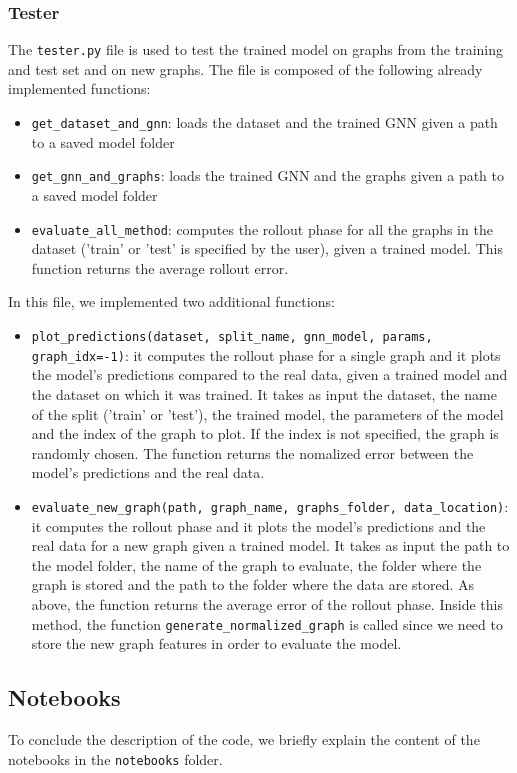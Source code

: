 \documentclass[11pt,a4paper]{article}
\begin{document}
\subsubsection*{Tester}
The \texttt{tester.py} file is used to test the trained model on graphs from the training and test set and on new graphs. The file is composed of the following already implemented functions: 
\begin{itemize}
    \item \texttt{get\_dataset\_and\_gnn}: loads the dataset and the trained GNN given a path to a saved model folder
    \item \texttt{get\_gnn\_and\_graphs}: loads the trained GNN and the graphs given a path to a saved model folder
    \item \texttt{evaluate\_all\_method}: computes the rollout phase for all the graphs in the dataset ('train' or 'test' is specified by the user), given a trained model. This function returns the average rollout error. 
\end{itemize}

In this file, we implemented two additional functions:
\begin{itemize}
    \item \texttt{plot\_predictions(dataset, split\_name, gnn\_model, params, graph\_idx=-1)}: it computes the rollout phase for a single graph and it plots the model's predictions compared to the real data, given a trained model and the dataset on which it was trained.
    It takes as input the dataset, the name of the split ('train' or 'test'), the trained model, the parameters of the model and the index of the graph to plot. If the index is not specified, the graph is randomly chosen. The function returns the nomalized error between the model's predictions and the real data.
    \item \texttt{evaluate\_new\_graph(path, graph\_name, graphs\_folder, data\_location)}: it computes the rollout phase and it plots the model's predictions and the real data for a new graph given a trained model. It takes as input the path to the model folder, the name of the graph to evaluate, the folder where the graph is stored and the path to the folder where the data are stored. As above, the function returns the average error of the rollout phase. Inside this method, the function \texttt{generate\_normalized\_graph} is called since we need to store the new graph features in order to evaluate the model.
\end{itemize}

\subsection{Notebooks}
To conclude the description of the code, we briefly explain the content of the notebooks in the \texttt{notebooks} folder. 
\end{document}
